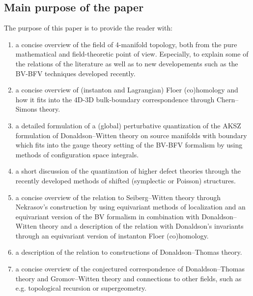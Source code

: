 \documentclass[11pt,colorinlistoftodos]{amsart}
\numberwithin{equation}{subsection}
\theoremstyle{plain}
\theoremstyle{definition}
\theoremstyle{remark}
\begin{document}
\subsection{Main purpose of the paper}
The purpose of this paper is to provide the reader with: 
\begin{enumerate}[$(i)$]
\item a concise overview of the field of 4-manifold topology, both from the pure mathematical and field-theoretic point of view. Especially, to explain some of the relations of the literature as well as to new developements such as the BV-BFV techniques developed recently. 
\item a concise overview of (instanton and Lagrangian) Floer (co)homology and how it fits into the 4D-3D bulk-boundary correspondence through Chern--Simons theory. 
\item a detailed formulation of a (global) perturbative quantization of the AKSZ formulation of Donaldson--Witten theory on source manifolds with boundary which fits into the gauge theory setting of the BV-BFV formalism by using methods of configuration space integrals. 
\item a short discussion of the quantization of higher defect theories through the recently developed methods of shifted (symplectic or Poisson) structures.
\item a concise overview of the relation to Seiberg--Witten theory through Nekrasov's construction by using equivariant methods of localization and an equivariant version of the BV formalism in combination with Donaldson--Witten theory and a description of the relation with Donaldson's invariants through an equivariant version of instanton Floer (co)homology.  
\item a description of the relation to constructions of Donaldson--Thomas theory.
\item a concise overview of the conjectured correspondence of Donaldson--Thomas theory and Gromov--Witten theory and connections to other fields, such as e.g. topological recursion or supergeometry.
\end{enumerate}
\end{document}
